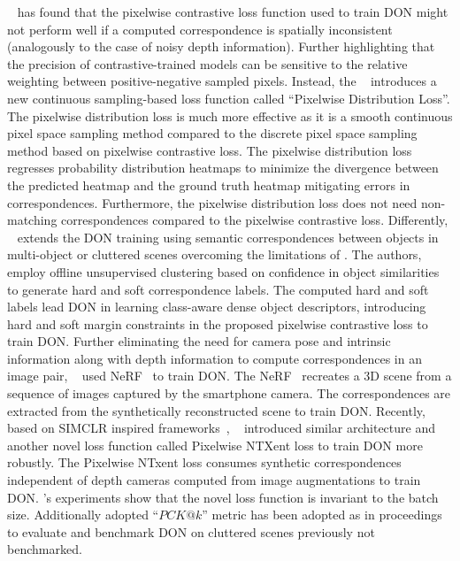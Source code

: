 \citeauthor{florence2020dense}~\cite{florence2020dense} has found that the pixelwise contrastive loss function used to train DON might not perform well if a computed
correspondence is spatially inconsistent (analogously to the case of noisy depth information). Further highlighting that the precision
of contrastive-trained models can be sensitive to the
relative weighting between positive-negative sampled pixels. Instead, the \citeauthor{florence2020dense}~\cite{florence2020dense} introduces a new continuous
sampling-based loss function called ``Pixelwise Distribution Loss''.
The pixelwise distribution loss is much more effective as it is a smooth continuous pixel space sampling method compared to the
discrete pixel space sampling method based on pixelwise contrastive loss.
The pixelwise distribution loss regresses probability distribution heatmaps to minimize the divergence between the predicted
heatmap and the ground truth heatmap mitigating errors in correspondences. Furthermore, the pixelwise distribution loss does not
need non-matching correspondences compared to the
pixelwise contrastive loss.
Differently, \citeauthor{hadjivelichkov2021fully}~\cite{hadjivelichkov2021fully} extends the DON training using semantic correspondences between objects in multi-object
or cluttered scenes overcoming the limitations of \parencites{hartley2003multiple}{belkin2003laplacian}.
The authors, \citeauthor{hadjivelichkov2021fully}~\cite{hadjivelichkov2021fully} employ offline unsupervised clustering based on confidence in object similarities to generate hard and soft correspondence labels.
The computed hard and soft labels lead DON in learning class-aware dense object descriptors, introducing hard and soft margin constraints in the proposed pixelwise contrastive loss to train DON.
Further eliminating the need for camera pose and intrinsic information along with depth information to compute correspondences in an image pair, \citeauthor{nerf-Supervision}~\cite{nerf-Supervision} used
NeRF~\cite{mildenhall2021nerf} to train DON. The NeRF~\cite{mildenhall2021nerf} recreates a 3D scene from a sequence of images captured by the smartphone camera. The correspondences are extracted from
the synthetically reconstructed scene to train DON.
Recently, based on SIMCLR inspired frameworks~\parencites{chen2020simple}{zbontar2021barlow},
\citeauthor{adrian2022efficient}~\cite{adrian2022efficient} introduced similar architecture and another novel loss function called
Pixelwise NTXent loss to train DON more robustly.
The Pixelwise NTxent loss consumes synthetic correspondences independent of depth cameras computed from image augmentations to train DON.
\citeauthor{adrian2022efficient}'s experiments show that the novel loss function is invariant to the batch size.
Additionally adopted ``$PCK@k$''
metric has been adopted as in proceedings \parencites{chai2019multi}{fathy2018hierarchical} to evaluate and benchmark
DON on cluttered scenes previously not benchmarked.

